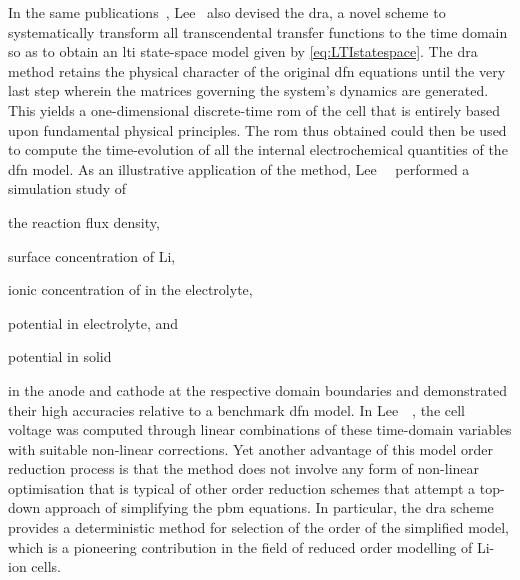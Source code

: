 In the  same publications~\cite{Lee2012a,Lee2012}, Lee~\etal{} also  devised the
\gls{dra},  a  novel  scheme  to  systematically  transform  all  transcendental
transfer functions to  the time domain so as to  obtain an \gls{lti} state-space
model  given  by  \cref{eq:LTIstatespace}.  The  \gls{dra}  method  retains  the
physical character of the original \gls{dfn}  equations until the very last step
wherein the matrices governing the  system's dynamics are generated. This yields
a one-dimensional  discrete-time \gls{rom}  of the cell  that is  entirely based
upon fundamental  physical principles.  The \gls{rom}  thus obtained  could then
be  used to  compute  the  time-evolution of  all  the internal  electrochemical
quantities of the \gls{dfn} model. As an illustrative application of the method,
Lee~\etal~\cite{Lee2012a} performed a simulation study of
\begin{enumerate*}[label=\itshape\alph*\upshape)]
    \item the reaction flux density,
    \item surface concentration of Li,
    \item ionic concentration of  in the electrolyte,
    \item potential in electrolyte, and
    \item potential in solid
\end{enumerate*}
in   the  anode   and  cathode   at   the  respective   domain  boundaries   and
demonstrated  their high  accuracies relative  to a  benchmark \gls{dfn}  model.
In  Lee~\etal~\cite{Lee2012,Lee2012a}, the  cell  voltage  was computed  through
linear  combinations of  these  time-domain variables  with suitable  non-linear
corrections. Yet another advantage of this model order reduction process is that
the method does not involve any  form of non-linear optimisation that is typical
of other order reduction schemes that attempt a top-down approach of simplifying
the \gls{pbm} equations. In  particular, the \gls{dra} scheme provides
a deterministic method for selection of the order of the simplified model, which
is a pioneering  contribution in the field of reduced  order modelling of Li-ion
cells.


